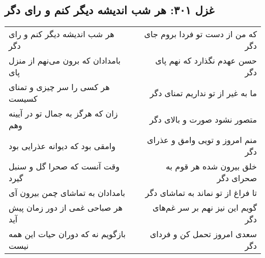 \begin{center}
\section*{غزل ۳۰۱: هر شب اندیشه دیگر کنم و رای دگر}
\label{sec:301}
\begin{longtable}{l p{0.5cm} r}
هر شب اندیشه دیگر کنم و رای دگر
&&
که من از دست تو فردا بروم جای دگر
\\
بامدادان که برون می‌نهم از منزل پای
&&
حسن عهدم نگذارد که نهم پای دگر
\\
هر کسی را سر چیزی و تمنای کسیست
&&
ما به غیر از تو نداریم تمنای دگر
\\
زان که هرگز به جمال تو در آیینه وهم
&&
متصور نشود صورت و بالای دگر
\\
وامقی بود که دیوانه عذرایی بود
&&
منم امروز و تویی وامق و عذرای دگر
\\
وقت آنست که صحرا گل و سنبل گیرد
&&
خلق بیرون شده هر قوم به صحرای دگر
\\
بامدادان به تماشای چمن بیرون آی
&&
تا فراغ از تو نماند به تماشای دگر
\\
هر صباحی غمی از دور زمان پیش آید
&&
گویم این نیز نهم بر سر غم‌های دگر
\\
بازگویم نه که دوران حیات این همه نیست
&&
سعدی امروز تحمل کن و فردای دگر
\\
\end{longtable}
\end{center}
